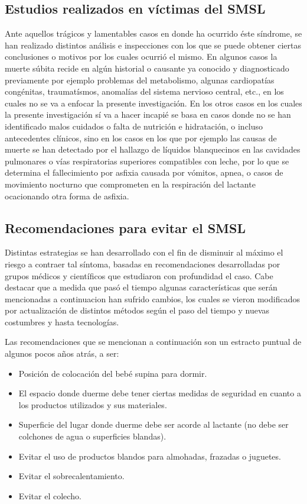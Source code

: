 \documentclass{IEEEtran}
\begin{document}
		\subsection{Estudios realizados en víctimas del SMSL}

			Ante aquellos trágicos y lamentables casos en donde ha ocurrido éste síndrome, se han realizado distintos análisis e inspecciones con los que se puede obtener ciertas conclusiones o motivos por los cuales ocurrió el mismo. En algunos casos la muerte súbita recide en algún historial o causante ya conocido y diagnosticado previamente por ejemplo problemas del metabolismo, algunas cardiopatías congénitas, traumatísmos, anomalías del sistema nervioso central, etc., en los cuales no se va a enfocar la presente investigación. En los otros casos en los cuales la presente investigación sí va a hacer incapié se basa en casos donde no se han identificado malos cuidados o falta de nutrición e hidratación, o incluso antecedentes clínicos, sino en los casos en los que por ejemplo las causas de muerte se han detectado por el hallazgo de líquidos blanquecinos en las cavidades pulmonares o vías respiratorias superiores compatibles con leche, por lo que se determina el fallecimiento por asfixia causada por vómitos, apnea, o casos de movimiento nocturno que comprometen en la respiración del lactante ocacionando otra forma de asfixia.
		
		\subsection{Recomendaciones para evitar el SMSL}

			Distintas estrategias se han desarrollado con el fin de disminuir al máximo el riesgo a contraer tal síntoma, basadas en recomendaciones desarrolladas por grupos médicos y científicos que estudiaron con profundidad el caso. Cabe destacar que a medida que pasó el tiempo algunas características que serán mencionadas a continuacion han sufrido cambios, los cuales se vieron modificados por actualización de distintos métodos según el paso del tiempo y nuevas costumbres y hasta tecnologías.

			Las recomendaciones que se mencionan a continuación son un estracto puntual de algunos pocos años atrás, a ser:

			\begin{itemize}
				\item Posición de colocación del bebé supina para dormir.
				\item El espacio donde duerme debe tener ciertas medidas de seguridad en cuanto a los productos utilizados y sus materiales.
				\item Superficie del lugar donde duerme debe ser acorde al lactante (no debe ser colchones de agua o superficies blandas).
				\item Evitar el uso de productos blandos para almohadas, frazadas o juguetes.
				\item Evitar el sobrecalentamiento.
				\item Evitar el colecho.
			\end{itemize}
\end{document}
